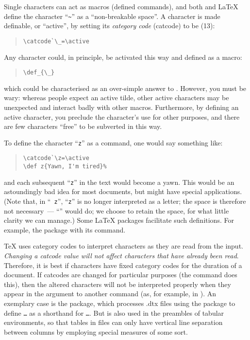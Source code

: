 Single characters can act as macros (defined commands), and both
\plaintex{} and \LaTeX{} define the character
``\texttt{\textasciitilde}'' as a ``non-breakable space''.  A
character is made definable, or ``active'', by setting its
\emph{category code} (catcode) to be  (13):
\begin{quote}
\begin{verbatim}
\catcode`\_=\active
\end{verbatim}
\end{quote}
Any character could, in principle, be activated this way and defined
as a macro:
\begin{quote}
\begin{verbatim}
\def_{\_}
\end{verbatim}
\end{quote}
which could be characterised as an over-simple answer to %
.  However, you must be
wary: whereas people expect an active tilde, other active characters
may be unexpected and interact badly with other macros.  Furthermore,
by defining an active character, you preclude the character's use for
other purposes, and there are few characters ``free'' to be subverted
in this way.

To define the character ``\texttt{z}'' as a command, one would say something
like:
\begin{quote}
\begin{verbatim}
\catcode`\z=\active
\def z{Yawn, I'm tired}%
\end{verbatim}
\end{quote}
and each subsequent ``\texttt{z}'' in the text would become a
yawn. This would be an astoundingly bad idea for most documents, but
might have special applications.  (Note that, in ``\texttt{
  z}'', ``\texttt{z}'' is no longer interpreted as a letter; the space
is therefore not necessary~--- ``'' would do; we choose to
retain the space, for what little clarity we can manage.)
Some \LaTeX{} packages facilitate such definitions. For example, the
 package with its  command.

\TeX{} uses category codes to interpret characters as they are read 
from the input.
\emph{Changing a catcode value will not affect characters that have already been read}.
Therefore, it is best if characters have fixed category codes for the
duration of a document.  If catcodes are changed for particular
purposes (the  command does this), then the altered
characters will not be interpreted properly when they  appear in the
argument to another command (as, for example, in
).
An exemplary case is the  package, which processes .dtx
files using the  package to define
\texttt{\textbar\dots{}\textbar} as a shorthand for
\texttt{\textbar\dots{}\textbar}. But \texttt{\textbar} is
also used in the preambles of tabular environments, so that tables in
 files can only have vertical line separation between
columns by employing special measures of some sort.

